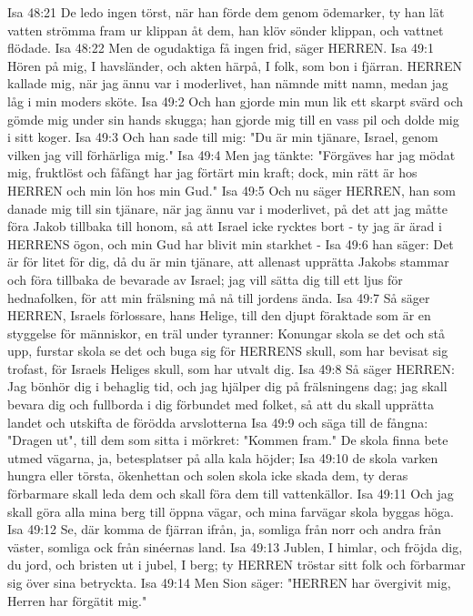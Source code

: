 Isa 48:21  De ledo ingen törst, när han förde dem genom ödemarker, ty han lät vatten strömma fram ur klippan åt dem, han klöv sönder klippan, och vattnet flödade.
Isa 48:22  Men de ogudaktiga få ingen frid, säger HERREN.
Isa 49:1  Hören på mig, I havsländer, och akten härpå, I folk, som bon i fjärran. HERREN kallade mig, när jag ännu var i moderlivet, han nämnde mitt namn, medan jag låg i min moders sköte.
Isa 49:2  Och han gjorde min mun lik ett skarpt svärd och gömde mig under sin hands skugga; han gjorde mig till en vass pil och dolde mig i sitt koger.
Isa 49:3  Och han sade till mig: "Du är min tjänare, Israel, genom vilken jag vill förhärliga mig."
Isa 49:4  Men jag tänkte: "Förgäves har jag mödat mig, fruktlöst och fåfängt har jag förtärt min kraft; dock, min rätt är hos HERREN och min lön hos min Gud."
Isa 49:5  Och nu säger HERREN, han som danade mig till sin tjänare, när jag ännu var i moderlivet, på det att jag måtte föra Jakob tillbaka till honom, så att Israel icke rycktes bort - ty jag är ärad i HERRENS ögon, och min Gud har blivit min starkhet -
Isa 49:6  han säger: Det är för litet för dig, då du är min tjänare, att allenast upprätta Jakobs stammar och föra tillbaka de bevarade av Israel; jag vill sätta dig till ett ljus för hednafolken, för att min frälsning må nå till jordens ända.
Isa 49:7  Så säger HERREN, Israels förlossare, hans Helige, till den djupt föraktade som är en styggelse för människor, en träl under tyranner: Konungar skola se det och stå upp, furstar skola se det och buga sig för HERRENS skull, som har bevisat sig trofast, för Israels Heliges skull, som har utvalt dig.
Isa 49:8  Så säger HERREN: Jag bönhör dig i behaglig tid, och jag hjälper dig på frälsningens dag; jag skall bevara dig och fullborda i dig förbundet med folket, så att du skall upprätta landet och utskifta de förödda arvslotterna
Isa 49:9  och säga till de fångna: "Dragen ut", till dem som sitta i mörkret: "Kommen fram." De skola finna bete utmed vägarna, ja, betesplatser på alla kala höjder;
Isa 49:10  de skola varken hungra eller törsta, ökenhettan och solen skola icke skada dem, ty deras förbarmare skall leda dem och skall föra dem till vattenkällor.
Isa 49:11  Och jag skall göra alla mina berg till öppna vägar, och mina farvägar skola byggas höga.
Isa 49:12  Se, där komma de fjärran ifrån, ja, somliga från norr och andra från väster, somliga ock från sinéernas land.
Isa 49:13  Jublen, I himlar, och fröjda dig, du jord, och bristen ut i jubel, I berg; ty HERREN tröstar sitt folk och förbarmar sig över sina betryckta.
Isa 49:14  Men Sion säger: "HERREN har övergivit mig, Herren har förgätit mig."
